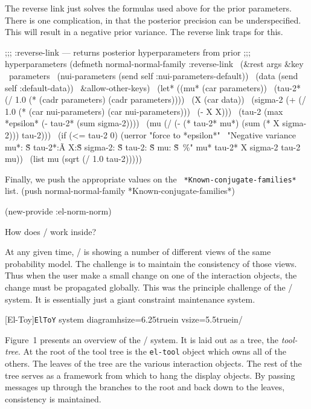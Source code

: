 The reverse link just solves the formulas used above for the prior
parameters.  There is one complication, in that the posterior
precision can be underspecified.  This will result in a negative prior
variance.  The reverse link traps for this.

\begincode
;;; :reverse-link --- returns posterior hyperparameters from prior
;;; hyperparameters 
(defmeth normal-normal-family :reverse-link
\  	(\&rest args \&key
\	       parameters
\	       (nui-parameters (send self :nui-parameters-default))
\	       (data (send self :default-data))
\	       \&allow-other-keys)
\  (let* ((mu* (car parameters))
\	 (tau-2* (/ 1.0 (* (cadr parameters) (cadr parameters))))
\	 (X (car data))
\	 (sigma-2 (+ (/ 1.0 (* (car nui-parameters) (car nui-parameters)))
\		     (- X X)))
\	 (tau-2 (max *epsilon* (- tau-2* (sum sigma-2))))
\	 (mu (/ (- (* tau-2* mu*) (sum (* X sigma-2))) tau-2)))
\    (if (<= tau-2 0) (uerror "force to *epsilon*"
\			     "Negative variance mu*: \~S tau-2*:\~A X:\~S
sigma-2: \~S tau-2: \~S mu: \~S~\%" mu* tau-2* X sigma-2 tau-2 mu))
\    (list mu (sqrt (/ 1.0 tau-2)))))
\endcode

Finally, we push the appropriate values on the {\tt
*Known-conjugate-families*\/} list.
\begincode
(push normal-normal-family *Known-conjugate-families*)

(new-provide :el-norm-norm)
\endcode

  How does \eltoy/{} work inside?

At any given time, \eltoy/ is showing a number of different views of
the same probability model.  The challenge is to maintain the
consistency of those views.  Thus when the user make a small change on
one of the interaction objects, the change must be propagated
globally.  This was the principle challenge of the \eltoy/ system.  It
is essentially just a giant constraint maintenance system.

\prologue{\adobe}
[El-Toy]{{\tt ElToY\/} system diagram}hsize=6.25truein
vsize=5.5truein/ 

Figure~1 presents an overview of the \eltoy/ system.  It is laid out
as a tree, the {\it tool-tree\/}.  At the root of the tool tree is the
{\tt el-tool\/} object which owns all of the others.  The leaves of the tree
are the various interaction objects.  The rest of the tree serves as a
framework from which to hang the display objects.  By passing messages
up through the branches to the root and back down to the leaves,
consistency is maintained.

